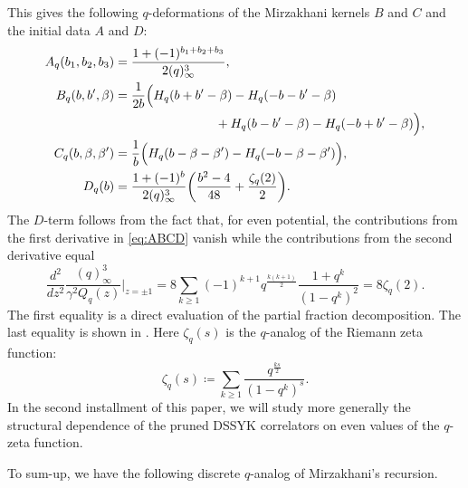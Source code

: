 \documentclass[a4paper,11pt,english]{article}
\theoremstyle{plain}
\theoremstyle{definition}
\theoremstyle{plain}
\begin{document}
This gives the following $q$-deformations of the Mirzakhani kernels $B$ and $C$ and the initial data $A$ and $D$:
\begin{equation}\label{eq:ABCD:qWP}
\begin{aligned}
	A_q(b_1,b_2,b_3)
	& = \frac{1+(-1)^{b_1+b_2+b_3}}{2(q)_{\infty}^{3}}, \\
	B_q(b,b',\beta)
	& =
	\frac{1}{2b} \Bigl(
		H_q(b + b' - \beta)
		-
		H_q(-b - b' - \beta) \\
	& \qquad\qquad\qquad\qquad
		+
		H_q(b - b' - \beta)
		-
		H_q(-b + b' - \beta)
	\Bigr) , \\
	C_q(b,\beta,\beta')
	& =
	\frac{1}{b} \Bigl(
		H_q(b - \beta - \beta')
		-
		H_q(-b - \beta - \beta')
	\Bigr) , \\
	D_q(b)
	& =
	\frac{1+(-1)^{b}}{2 (q)_{\infty}^{3}} \biggl( \frac{b^2 - 4}{48} + \frac{\zeta_q(2)}{2} \biggr) .
\end{aligned}
\end{equation}
The $D$-term follows from the fact that, for even potential, the contributions from the first derivative in \cref{eq:ABCD} vanish while the contributions from the second derivative equal
\begin{equation}
	\frac{d^2}{dz^2}\frac{(q)_{\infty}^{3}}{\gamma^2 Q_q(z)} \bigg|_{z = \pm 1}
	=
	8
	\sum_{k \ge 1} (-1)^{k+1} q^{\frac{k(k+1)}{2}} \frac{1 + q^k}{(1 - q^k)^2}
	=
	8 \zeta_q(2).
\end{equation}
The first equality is a direct evaluation of the partial fraction decomposition. The last equality is shown in \cite[corollary~1.1]{HH15}. Here $\zeta_q(s)$ is the $q$-analog of the Riemann zeta function:
\begin{equation}
	\zeta_q(s)
    \coloneqq
    \sum_{k \ge 1} \frac{q^{\frac{ks}{2}}}{(1 - q^k)^s} .
\end{equation}
In the second installment of this paper, we will study more generally the structural dependence of the pruned DSSYK correlators on even values of the $q$-zeta function.

To sum-up, we have the following discrete $q$-analog of Mirzakhani's recursion.
\end{document}
